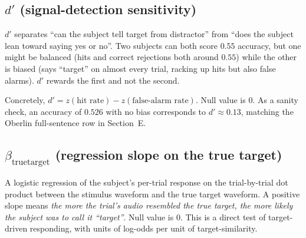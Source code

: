 \documentclass[11pt]{article}
\begin{document}
\begin{center}
\end{center}

\subsection{$d'$ (signal-detection sensitivity)}
$d'$ separates ``can the subject tell target from distractor'' from
``does the subject lean toward saying yes or no''. Two subjects can
both score $0.55$ accuracy, but one might be balanced (hits and
correct rejections both around $0.55$) while the other is biased
(says ``target'' on almost every trial, racking up hits but also
false alarms). $d'$ rewards the first and not the second.

Concretely, $d' = z(\text{hit rate}) - z(\text{false-alarm rate})$.
Null value is $0$. As a sanity check, an accuracy of $0.526$ with no
bias corresponds to $d' \approx 0.13$, matching the Oberlin
full-sentence row in Section~E.\@

\subsection{$\beta_{\text{truetarget}}$ (regression slope on the true target)}
A logistic regression of the subject's per-trial response on the
trial-by-trial dot product between the stimulus waveform and the true
target waveform. A positive slope means \emph{the more the trial's
audio resembled the true target, the more likely the subject was to
call it ``target''}. Null value is $0$. This is a direct test of
target-driven responding, with units of log-odds per unit of
target-similarity.
\end{document}
